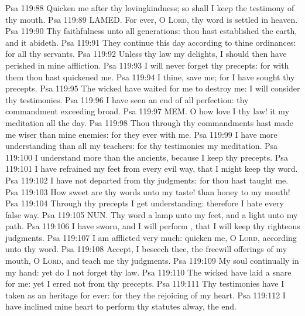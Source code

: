 \vs Psa 119:88 Quicken me after thy lovingkindness; so shall I keep the testimony of thy mouth.
\vs Psa 119:89 LAMED. For ever, O \textsc{Lord}, thy word is settled in heaven.
\vs Psa 119:90 Thy faithfulness  unto all generations: thou hast established the earth, and it abideth.
\vs Psa 119:91 They continue this day according to thine ordinances: for all  thy servants.
\vs Psa 119:92 Unless thy law  my delights, I should then have perished in mine affliction.
\vs Psa 119:93 I will never forget thy precepts: for with them thou hast quickened me.
\vs Psa 119:94 I  thine, save me; for I have sought thy precepts.
\vs Psa 119:95 The wicked have waited for me to destroy me:  I will consider thy testimonies.
\vs Psa 119:96 I have seen an end of all perfection:  thy commandment  exceeding broad.
\vs Psa 119:97 MEM. O how love I thy law! it  my meditation all the day.
\vs Psa 119:98 Thou through thy commandments hast made me wiser than mine enemies: for they  ever with me.
\vs Psa 119:99 I have more understanding than all my teachers: for thy testimonies  my meditation.
\vs Psa 119:100 I understand more than the ancients, because I keep thy precepts.
\vs Psa 119:101 I have refrained my feet from every evil way, that I might keep thy word.
\vs Psa 119:102 I have not departed from thy judgments: for thou hast taught me.
\vs Psa 119:103 How sweet are thy words unto my taste!  than honey to my mouth!
\vs Psa 119:104 Through thy precepts I get understanding: therefore I hate every false way.
\vs Psa 119:105 NUN. Thy word  a lamp unto my feet, and a light unto my path.
\vs Psa 119:106 I have sworn, and I will perform , that I will keep thy righteous judgments.
\vs Psa 119:107 I am afflicted very much: quicken me, O \textsc{Lord}, according unto thy word.
\vs Psa 119:108 Accept, I beseech thee, the freewill offerings of my mouth, O \textsc{Lord}, and teach me thy judgments.
\vs Psa 119:109 My soul  continually in my hand: yet do I not forget thy law.
\vs Psa 119:110 The wicked have laid a snare for me: yet I erred not from thy precepts.
\vs Psa 119:111 Thy testimonies have I taken as an heritage for ever: for they  the rejoicing of my heart.
\vs Psa 119:112 I have inclined mine heart to perform thy statutes alway,  the end.
